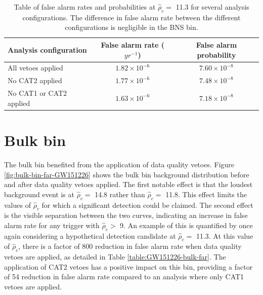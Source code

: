 \begin{table}[!ht]%
  \begin{center}
    \begin{tabular}{lcc}
      \hline
      Analysis configuration & False alarm rate ($yr^{-1}$) & False alarm probability \\ \hline
      All vetoes applied & $1.82\times10^{-6}$  & $7.60\times10^{-8}$ \\
      No CAT2 applied & $1.77\times10^{-6}$ & $7.48\times10^{-8}$ \\
      No CAT1 or CAT2 applied & $1.63\times10^{-6}$ & $7.18\times10^{-8}$ \\ \hline
    \end{tabular}
  \end{center}
  \caption[BNS bin FAR - GW151226 analysis]{Table of false alarm rates and probabilities at $\hat{\rho}_{c} =$ 11.3 for several analysis configurations. %
           The difference in false alarm rate between the different configurations is negligible %
           in the BNS bin.}
  \label{table:151226-bns-far}
\end{table}

\section{Bulk bin}

The bulk bin benefited from the application of data quality vetoes. Figure
\ref{fig:bulk-bin-far-GW151226} shows the bulk bin background distribution before and after
data quality vetoes applied. The first notable
effect is that the loudest background event is at $\hat{\rho}_{c} =$ 14.8 rather than
$\hat{\rho}_{c} =$ 11.8. This effect
limits the values of $\hat{\rho}_{c}$ for which a significant detection could be claimed.
The second effect is the visible separation between the two curves, indicating an
increase in false alarm rate for any trigger with $\hat{\rho}_{c} >$ 9. An example of this is
quantified by once again considering a hypothetical detection candidate at $\hat{\rho}_{c} =$ 11.3.
At this value of $\hat{\rho}_{c}$, there is a factor of 800 reduction in false alarm rate when
data quality vetoes are applied, as detailed in Table \ref{table:GW151226-bulk-far}.
The application of CAT2 vetoes has a positive impact on this bin, providing a factor of 54
reduction in false alarm rate compared to an analysis where only CAT1 vetoes are applied.

